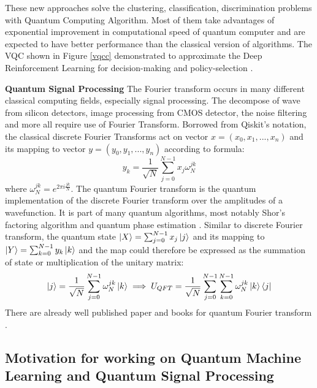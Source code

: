\documentclass{article}
\begin{document}
These new approaches solve 
the clustering, classification, discrimination problems with
Quantum Computing Algorithm. Most of them take advantages of exponential 
improvement in computational speed of quantum computer and are expected 
to have better performance than the classical version of algorithms. 
The VQC shown in Figure \ref{vqcc} demonstrated to 
approximate the Deep Reinforcement Learning for decision-making 
and policy-selection \cite{ieee_vqc}. 

\textbf{Quantum Signal Processing}
The Fourier transform occurs in many different classical computing 
fields, especially signal processing. The decompose of wave from 
silicon detectors, image processing from CMOS detector, the noise filtering
and more all require use of Fourier Transform. Borrowed from Qiskit's notation, 
the classical discrete Fourier Transforms
act on vector $x = (x_0, x_1,...,x_n)$ and its mapping to vector $y = (y_0, y_1,...,y_n)$
according to formula:
\begin{equation}
  y_k = \frac{1}{\sqrt{N}} \sum^{N-1}_{j=0} x_j \omega_N^{jk}
\end{equation}
where $\omega_N^{jk} = e^{2\pi i \frac{jk}{N}}$. The quantum Fourier 
transform is the quantum implementation of the discrete Fourier 
transform over the amplitudes of a wavefunction. It is part of 
many quantum algorithms, most notably Shor's factoring algorithm \cite{qc_Shor_1997}
and quantum phase estimation \cite{qc_phase_estimation}. Similar to discrete Fourier 
transform, the quantum state $ \ket{X} = \sum^{N-1}_{j=0} x_j \ket{j} $ and its mapping to 
$ \ket{Y} = \sum^{N-1}_{k=0} y_k \ket{k} $
and the map could therefore be expressed as the summation of state 
or multiplication of the unitary matrix:
\begin{equation}
  \ket{j}  = \frac{1}{\sqrt{N}} \sum^{N-1}_{j=0} \omega_N^{jk} \ket{k} \implies
  U_{QFT}= \frac{1}{\sqrt{N}} \sum^{N-1}_{j=0} \sum^{N-1}_{k=0}  \omega_N^{jk} \ket{k} \bra{j}
\end{equation}
There are already well published paper and books for quantum Fourier transform \cite{qc_book}.

\subsection{Motivation for working on Quantum Machine Learning and Quantum Signal Processing}
\end{document}
